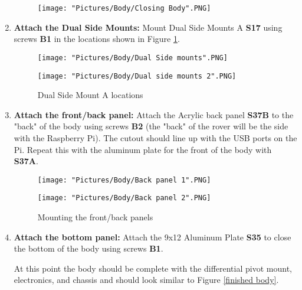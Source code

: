 \documentclass[12pt]{article}
\begin{document}
\begin{enumerate}
\begin{figure}[H]
	\centering
	\texttt{[image: "Pictures/Body/Closing Body".PNG]}
\end{figure}

\item \textbf{Attach the Dual Side Mounts:} Mount Dual Side Mounts A \textbf{S17} using screws \textbf{B1} in the locations shown in Figure \ref{Dual Side Mounts}. 

\begin{figure}[H]
  \centering
  \begin{minipage}[b]{0.40\textwidth}
    \texttt{[image: "Pictures/Body/Dual Side mounts".PNG]}
  \end{minipage}
  \hfill
  \begin{minipage}[b]{0.40\textwidth}
    \texttt{[image: "Pictures/Body/Dual side mounts 2".PNG]}
  \end{minipage}
  \caption{Dual Side Mount A locations}
  \label{Dual Side Mounts}
\end{figure}

\item \textbf{Attach the front/back panel: } Attach the Acrylic back panel \textbf{S37B} to the "back" of the body using screws \textbf{B2} (the "back" of the rover will be the side with the Raspberry Pi). The cutout should line up with the USB ports on the Pi. Repeat this with the aluminum plate for the front of the body with \textbf{S37A}.

\begin{figure}[H]
  \centering
  \begin{minipage}[b]{0.40\textwidth}
    \texttt{[image: "Pictures/Body/Back panel 1".PNG]}
  \end{minipage}
  \hfill
  \begin{minipage}[b]{0.40\textwidth}
    \texttt{[image: "Pictures/Body/Back panel 2".PNG]}
  \end{minipage}
  \caption{Mounting the front/back panels}
  \label{front/back panels}
\end{figure}

\item \textbf{Attach the bottom panel: } Attach the 9x12 Aluminum Plate \textbf{S35} to close the bottom of the body using screws \textbf{B1}. 

At this point the body should be complete with the differential pivot mount, electronics, and chassis and should look similar to Figure \ref{finished body}. 


\end{enumerate}
\end{document}
